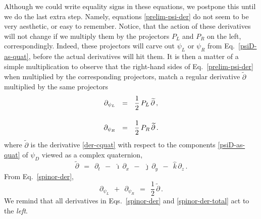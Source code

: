 \documentclass[epsfig,12pt]{article}
\newcommand{\p}{\partial}
\newcommand{\wt}{\widetilde}
\newcommand{\ii}{\hat\imath}
\newcommand{\jj}{\hat\jmath}
\newcommand{\kk}{\hat k}
\begin{document}
	Although we could write equality signs in these equations, we postpone this
	until we do the last extra step.
	Namely, equations \eqref{prelim-psi-der} do not seem to be very aesthetic,
	or easy to remember.
	Notice, that the action of these derivatives will not change if we multiply
	them by the projectors $ P_L $ and $ P_R $ on the left, correspondingly.
	Indeed, these projectors will carve out $ \psi_L $ or $ \psi_R $ from Eq.~\eqref{psiD-as-quat},
	before the actual derivatives will hit them.
	It is then a matter of a simple multiplication to observe that the right-hand
	sides of Eq.~\eqref{prelim-psi-der} when multiplied by the corresponding projectors,
	match a regular derivative $ \wt\p $ multiplied by the same projectors
\begin{align}
%
\notag
	\p_{\psi_L}	& ~~=~~		\frac 1 2\, P_L\, \wt\p\,,
	\\[4mm]
%
\label{spinor-der}
	\p_{\psi_R}	& ~~=~~		\frac 1 2\, P_R\, \wt\p\,.
\end{align}
	where $ \wt\p $ is the derivative \eqref{der-cquat} with respect
	to the components \eqref{psiD-as-quat} of $ \psi_D $ viewed as a complex quaternion,
\begin{equation}
	\wt\p	~~=~~	\p_t  ~~-~~  \ii\,\p_x  ~~-~~  \jj\,\p_y  ~~-~~  \kk\,\p_z\,.
\end{equation}
	From Eq.~\eqref{spinor-der}, 
\begin{equation}
\label{spinor-der-total}
	\p_{\psi_L}  ~~+~~  \p_{\psi_R}  ~~=~~  \frac 1 2\, \wt\p\,.
\end{equation}
	We remind that all derivatives in Eqs.~\eqref{spinor-der} and \eqref{spinor-der-total}
	act to the \emph{left}.
\end{document}

